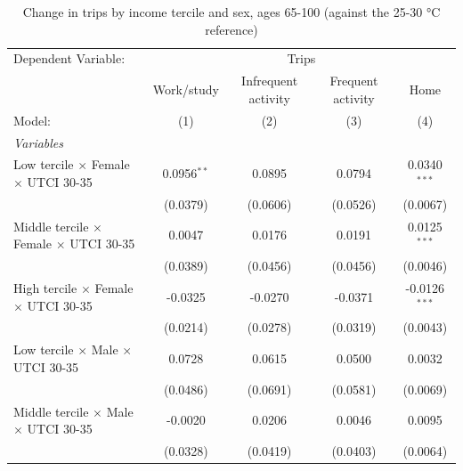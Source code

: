 
\begin{table}[htbp]
   \caption{\label{table_rq3_65-100} Change in trips by income tercile and sex, ages 65-100 (against the 25-30 °C reference)}
   \centering
   \scriptsize
   \renewcommand*{\arraystretch}{0.75}
   \begin{tabular}{lcccc}
      \tabularnewline \midrule \midrule
      Dependent Variable: & \multicolumn{4}{c}{Trips}\\
                                                           & Work/study      & Infrequent activity & Frequent activity & Home \\   
      Model:                                               & (1)             & (2)                 & (3)               & (4)\\  
      \midrule
      \emph{Variables}\\
      Low tercile $\times$ Female $\times$ UTCI 30-35      & 0.0956$^{**}$   & 0.0895              & 0.0794            & 0.0340$^{***}$\\   
                                                           & (0.0379)        & (0.0606)            & (0.0526)          & (0.0067)\\   
      Middle tercile $\times$ Female $\times$ UTCI 30-35   & 0.0047          & 0.0176              & 0.0191            & 0.0125$^{***}$\\   
                                                           & (0.0389)        & (0.0456)            & (0.0456)          & (0.0046)\\   
      High tercile $\times$ Female $\times$ UTCI 30-35     & -0.0325         & -0.0270             & -0.0371           & -0.0126$^{***}$\\   
                                                           & (0.0214)        & (0.0278)            & (0.0319)          & (0.0043)\\   
      Low tercile $\times$ Male $\times$ UTCI 30-35        & 0.0728          & 0.0615              & 0.0500            & 0.0032\\   
                                                           & (0.0486)        & (0.0691)            & (0.0581)          & (0.0069)\\   
      Middle tercile $\times$ Male $\times$ UTCI 30-35     & -0.0020         & 0.0206              & 0.0046            & 0.0095\\   
                                                           & (0.0328)        & (0.0419)            & (0.0403)          & (0.0064)\\   

\end{tabular}
\end{table}
